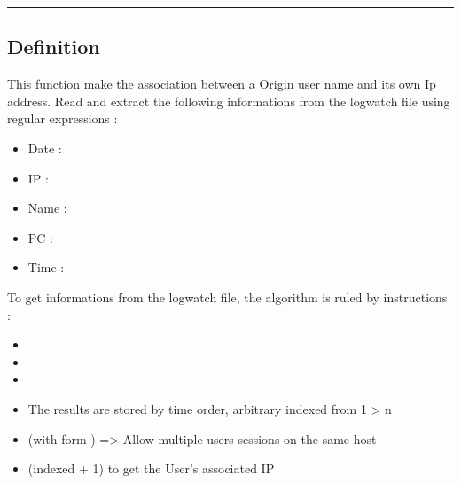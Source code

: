 \documentclass[letterpaper,10pt,english]{sphinxmanual}
\begin{document}
\bigskip\hrule\bigskip



\subsection{Definition}
\label{\detokenize{GUIFI/Read_and_treat_log:definition}}
\sphinxAtStartPar
This function make the association between a Origin user name and its own Ip address.
Read and extract the following informations from the logwatch file using regular expressions :
\begin{itemize}
\item {} 
\sphinxAtStartPar
Date : 

\item {} 
\sphinxAtStartPar
IP : 

\item {} 
\sphinxAtStartPar
Name : 

\item {} 
\sphinxAtStartPar
PC : 

\item {} 
\sphinxAtStartPar
Time : 

\end{itemize}

\sphinxAtStartPar
To get informations from the logwatch file, the algorithm is ruled by instructions :
\begin{itemize}
\item {} 
\sphinxAtStartPar
{}

\item {} 
\sphinxAtStartPar
{}

\item {} 
\sphinxAtStartPar
{}

\item {} 
\sphinxAtStartPar
{} The results are stored by time order, arbitrary indexed from 1 \sphinxhyphen{}\textgreater{} n

\item {} 
\sphinxAtStartPar
{} (with form ) =\textgreater{} Allow multiple users sessions on the same host

\item {} 
\sphinxAtStartPar
{} (indexed +\sphinxhyphen{} 1) to get the User’s associated IP

\end{itemize}
\end{document}
